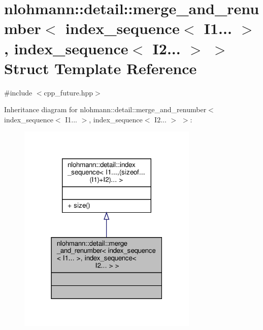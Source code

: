 \hypertarget{structnlohmann_1_1detail_1_1merge__and__renumber_3_01index__sequence_3_01_i1_8_8_8_01_4_00_01indf5ec8c9c7b5107e4b381e3ca4c1be2ca}{}\section{nlohmann\+:\+:detail\+:\+:merge\+\_\+and\+\_\+renumber$<$ index\+\_\+sequence$<$ I1... $>$, index\+\_\+sequence$<$ I2... $>$ $>$ Struct Template Reference}
\label{structnlohmann_1_1detail_1_1merge__and__renumber_3_01index__sequence_3_01_i1_8_8_8_01_4_00_01indf5ec8c9c7b5107e4b381e3ca4c1be2ca}


{\ttfamily \#include $<$cpp\+\_\+future.\+hpp$>$}



Inheritance diagram for nlohmann\+:\+:detail\+:\+:merge\+\_\+and\+\_\+renumber$<$ index\+\_\+sequence$<$ I1... $>$, index\+\_\+sequence$<$ I2... $>$ $>$\+:\nopagebreak
\begin{figure}[H]
\begin{center}
\leavevmode
\includegraphics[width=243pt]{structnlohmann_1_1detail_1_1merge__and__renumber_3_01index__sequence_3_01_i1_8_8_8_01_4_00_01ind6c27662b24eb9b5dea448f2c0400428a}
\end{center}
\end{figure}


